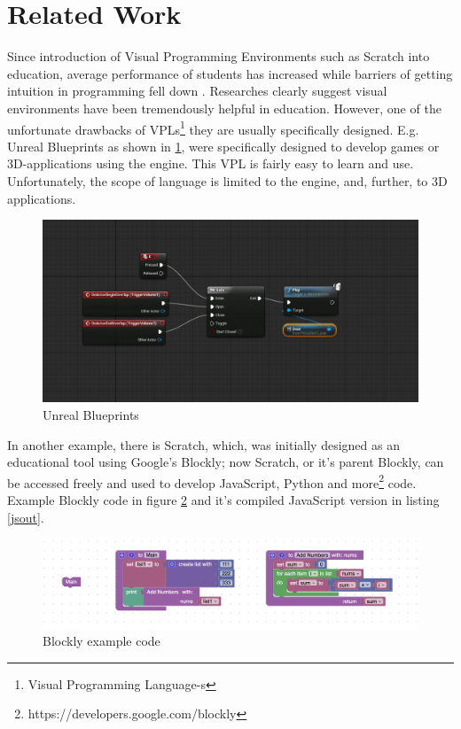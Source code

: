 \documentclass{article}
\begin{document}
\section{Related Work}
Since introduction of Visual Programming Environments such as Scratch into education, average performance of students has increased \citep{tsai_2019_improving} while barriers of getting intuition in programming fell down \citep{kelleher_2005_lowering}. Researches \citep{7318200,tsai_2019_improving,kelleher_2005_lowering} clearly suggest visual environments have been tremendously helpful in education.
However, one of the unfortunate drawbacks of VPLs\footnote{Visual Programming Language-s} they are usually specifically designed.
E.g. Unreal Blueprints as shown in \ref{fig:blueprints}, were specifically designed to develop games or 3D-applications using the engine. This VPL is fairly easy to learn and use. Unfortunately, the scope of language is limited to the engine, and, further, to 3D applications. 

\begin{figure}[H]
\centering
\includegraphics[width=1\textwidth]{0bfef1e3868153cc4b49a3dac0214b0d.jpg}
\caption{Unreal Blueprints}
\label{fig:blueprints}
\end{figure}

In another example, there is Scratch, which, was initially designed as an educational tool using Google's Blockly; now Scratch, or it's parent Blockly, can be accessed freely and used to develop JavaScript, Python and more\footnote{https://developers.google.com/blockly} code. Example Blockly code in figure \ref{fig:blockly} and it's compiled JavaScript version in listing \ref{jsout}.

\begin{figure}[H]
\centering
\includegraphics[width=1\textwidth]{Screenshot 2021-05-21 at 05.08.44.png}
\caption{Blockly example code}
\label{fig:blockly}
\end{figure}
\end{document}
